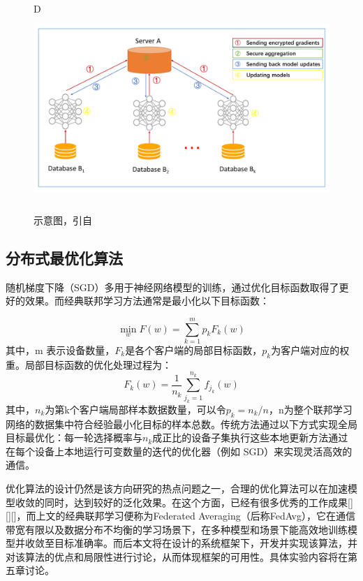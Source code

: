 \documentclass[zihao = -4,cn]{oucart}
\begin{document}
\begin{figure}[h]D
	\centering %
	\includegraphics[width=12cm,height=7cm]{assets/fed}
	\caption{示意图，引自\cite{yang2019federated}}
	\label{fig:MLP}
\end{figure}

\subsection{分布式最优化算法}
随机梯度下降（SGD）多用于神经网络模型的训练，通过优化目标函数取得了更好的效果。而经典联邦学习方法通常是最小化以下目标函数：\par
\begin{equation}
\min_{w} F(w) = \sum_{k=1}^{m}{p_k F_k(w)}
\end{equation}
其中，m 表示设备数量，$F_k$是各个客户端的局部目标函数，$p_k$为客户端对应的权重。局部目标函数的优化处理过程为：
\begin{equation}
F_k(w) = \frac{1}{n_k}\sum_{j_k=1}^{n_k}{f_{j_k}(w)}
\end{equation}
其中，$n_k$为第k个客户端局部样本数据数量，可以令$p_k=n_k/n$，n为整个联邦学习网络的数据集中符合经验最小化目标的样本总数。传统方法通过以下方式实现全局目标最优化：每一轮选择概率与$n_k$成正比的设备子集执行这些本地更新方法通过在每个设备上本地运行可变数量的迭代的优化器（例如 SGD）来实现灵活高效的通信。\par
优化算法的设计仍然是该方向研究的热点问题之一，合理的优化算法可以在加速模型收敛的同时，达到较好的泛化效果。在这个方面，已经有很多优秀的工作成果[][][]，而上文的经典联邦学习便称为Federated Averaging（后称FedAvg）\cite{mcmahan2016communication}，它在通信带宽有限以及数据分布不均衡的学习场景下，在多种模型和场景下能高效地训练模型并收敛至目标准确率。而后本文将在设计的系统框架下，开发并实现该算法，并对该算法的优点和局限性进行讨论，从而体现框架的可用性。具体实验内容将在第五章讨论。
\end{document}
